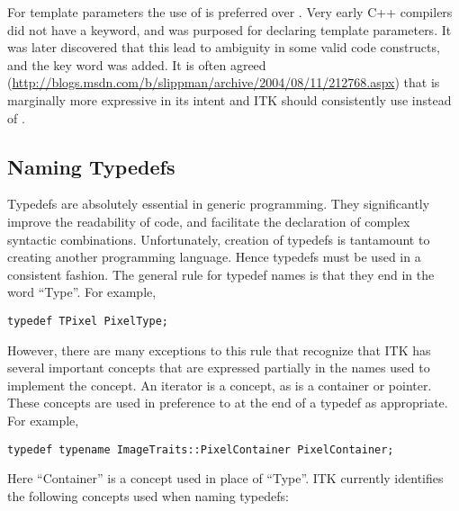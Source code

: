 For template parameters the use of  is preferred over
. Very early C++ compilers did not have a  keyword,
and  was purposed for declaring template parameters. It was later
discovered that this lead to ambiguity in some valid code constructs, and the
 key word was added. It is often agreed
(\href{http://blogs.msdn.com/b/slippman/archive/2004/08/11/212768.aspx}
{http://blogs.msdn.com/b/slippman/archive/2004/08/11/212768.aspx}) that
 is marginally more expressive in its intent and ITK should
consistently use  instead of .


\subsection{Naming Typedefs}
\label{subsec:NamingTypedefs}

Typedefs are absolutely essential in generic programming. They significantly
improve the readability of code, and facilitate the declaration of complex
syntactic combinations. Unfortunately, creation of typedefs is tantamount to
creating another programming language. Hence typedefs must be used in a
consistent fashion. The general rule for typedef names is that they end in the
word ``Type''. For example,

\small
\begin{verbatim}
typedef TPixel PixelType;
\end{verbatim}
\normalsize

However, there are many exceptions to this rule that recognize that ITK has
several important concepts that are expressed partially in the names used to
implement the concept. An iterator is a concept, as is a container or pointer.
These concepts are used in preference to  at the end of a typedef as
appropriate. For example,

\small
\begin{verbatim}
typedef typename ImageTraits::PixelContainer PixelContainer;
\end{verbatim}
\normalsize

Here ``Container'' is a concept used in place of ``Type''. ITK currently
identifies the following concepts used when naming typedefs:

